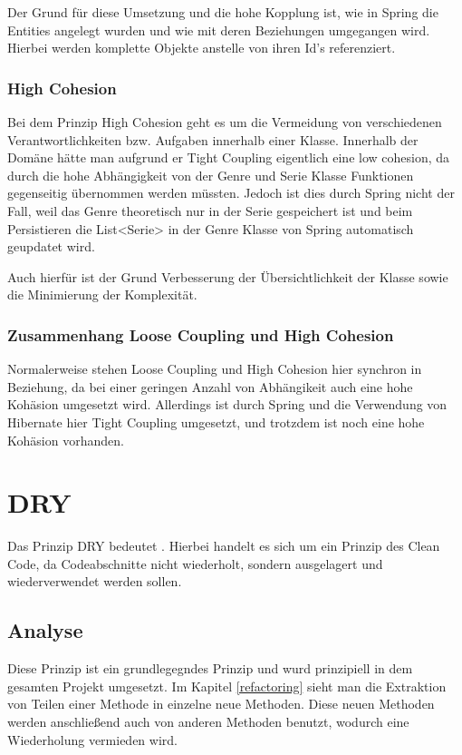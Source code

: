             Der Grund für diese Umsetzung und die hohe Kopplung ist, wie in Spring die Entities angelegt wurden und wie mit deren Beziehungen umgegangen wird. Hierbei werden komplette Objekte anstelle von ihren Id's referenziert.
    
        \subsubsection{High Cohesion}
            
            Bei dem Prinzip High Cohesion geht es um die Vermeidung von verschiedenen Verantwortlichkeiten bzw. Aufgaben innerhalb einer Klasse. Innerhalb der Domäne hätte man aufgrund er Tight Coupling eigentlich eine low cohesion, da durch die hohe Abhängigkeit von der Genre und Serie Klasse Funktionen gegenseitig übernommen werden müssten. Jedoch ist dies durch Spring nicht der Fall, weil das Genre theoretisch nur in der Serie gespeichert ist und beim Persistieren die List<Serie> in der Genre Klasse von Spring automatisch geupdatet wird.
            
            Auch hierfür ist der Grund Verbesserung der Übersichtlichkeit der Klasse sowie die Minimierung der Komplexität.
            
        \subsubsection{Zusammenhang Loose Coupling und High Cohesion}
        Normalerweise stehen Loose Coupling und High Cohesion  hier synchron in Beziehung, da bei einer geringen Anzahl von Abhängikeit auch eine hohe Kohäsion umgesetzt wird. Allerdings ist durch Spring und die Verwendung von Hibernate hier Tight Coupling umgesetzt, und trotzdem ist noch eine hohe Kohäsion vorhanden.

\section{DRY}
Das Prinzip DRY bedeutet . Hierbei handelt es sich um ein Prinzip des Clean Code, da Codeabschnitte nicht wiederholt, sondern ausgelagert und wiederverwendet werden sollen.

    \subsection{Analyse}
    Diese Prinzip ist ein grundlegegndes Prinzip und wurd prinzipiell in dem gesamten Projekt umgesetzt. Im Kapitel \cref{refactoring} sieht man die Extraktion von Teilen einer Methode in einzelne neue Methoden. Diese neuen Methoden werden anschließend auch von anderen Methoden benutzt, wodurch eine Wiederholung vermieden wird.
    

